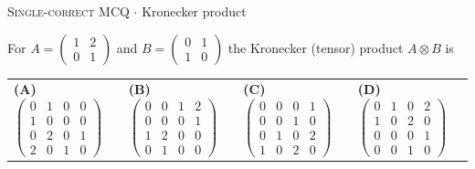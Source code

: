 \documentclass[11pt,a4paper]{article}
\newcommand{\optlabel}[1]{\textbf{(#1)}}
\newcommand{\correctlabel}[1]{\textcolor{okgreen}{\textbf{(#1)}\,\ding{51}}}
\newenvironment{qitem}[1]{\begin{list}{}{\setlength{\leftmargin}{3.3em}\setlength{\labelwidth}{3.1em}%
  \setlength{\labelsep}{0.2em}\setlength{\topsep}{3pt}\setlength{\parsep}{3pt}}\item[\textbf{Q.#1}\hfill]}{\end{list}}
\newcommand{\qmeta}[2]{{\footnotesize\color{black!60}\textsc{#1} \;$\cdot$\; #2}\par}
\begin{document}
\begin{qitem}{10}
\qmeta{Single-correct MCQ}{Kronecker product}
For $A = \begin{pmatrix}1 & 2\\ 0 & 1\end{pmatrix}$ and $B = \begin{pmatrix}0 & 1\\ 1 & 0\end{pmatrix}$ the Kronecker
(tensor) product $A \otimes B$ is
\par\smallskip\noindent\begin{tabularx}{\linewidth}{@{}*{4}{L}@{}}
\optlabel{A}\,$\begin{pmatrix}0&1&0&0\\1&0&0&0\\0&2&0&1\\2&0&1&0\end{pmatrix}$ & \optlabel{B}\,$\begin{pmatrix}0&0&1&2\\0&0&0&1\\1&2&0&0\\0&1&0&0\end{pmatrix}$ & \optlabel{C}\,$\begin{pmatrix}0&0&0&1\\0&0&1&0\\0&1&0&2\\1&0&2&0\end{pmatrix}$ & \correctlabel{D}\,$\begin{pmatrix}0&1&0&2\\1&0&2&0\\0&0&0&1\\0&0&1&0\end{pmatrix}$
\end{tabularx}
\end{qitem}
\end{document}
